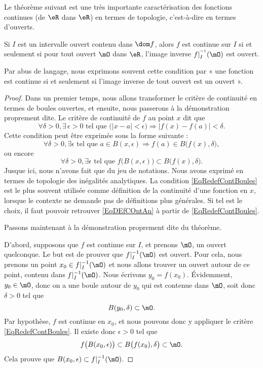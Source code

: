 Le théorème suivant est une très importante caractérisation des fonctions continues (de \( \eR\) dans \( \eR\)) en termes de topologie, c'est-à-dire en termes d'ouverts.

\begin{theorem}     \label{ThoContInvOuvert}
	Si \( I\) est un intervalle ouvert contenu dans \( \dom f\), alors \( f\) est continue sur \( I\) si et seulement si pour tout ouvert \( \mO\) dans \( \eR\), l'image inverse \( f|_I^{^{-1}}(\mO)\) est ouvert.
\end{theorem}

Par abus de langage, nous exprimons souvent cette condition par « une fonction est continue si et seulement si l'image inverse de tout ouvert est un ouvert ».

\begin{proof}

	Dans un premier temps, nous allons transformer le critère de continuité en termes de boules ouvertes, et ensuite, nous passerons à la démonstration proprement dite. Le critère de continuité de \( f\) au point \( x\) dit que
	\begin{equation}        \label{EqDEfCOntAn}
		\forall \delta>0, \exists\,\epsilon>0\text{ tel que }\big( | x-a |< \epsilon \big)\Rightarrow| f(x)-f(a) |<\delta.
	\end{equation}
	Cette condition peut être exprimée sous la forme suivante :
	\[
		\forall \delta>0, \exists\epsilon\text{ tel que } a\in B(x,\epsilon)\Rightarrow f(a)\in B\big( f(x),\delta \big),
	\]
	ou encore
	\begin{equation}        \label{EqRedefContBoules}
		\forall \delta>0,\exists\epsilon\text{ tel que } f\big( B(x,\epsilon) \big)\subset B\big( f(x),\delta \big).
	\end{equation}
	Jusque ici, nous n'avons fait que du jeu de notations. Nous avons exprimé en termes de topologie des inégalités analytiques. La condition \eqref{EqRedefContBoules} est le plus souvent utilisée comme définition de la continuité d'une fonction en \( x\), lorsque le contexte ne demande pas de définitions plus générales. Si tel est le choix, il faut pouvoir retrouver \eqref{EqDEfCOntAn} à partir de \eqref{EqRedefContBoules}.

	Passons maintenant à la démonstration proprement dite du théorème.

	D'abord, supposons que \( f\) est continue sur \( I\), et prenons \( \mO\), un ouvert quelconque. Le but est de prouver que \( f|_I^{-1}(\mO)\) est ouvert. Pour cela, nous prenons un point \( x_0\in f|_I^{-1}(\mO)\) et nous allons trouver un ouvert autour de ce point, contenu dans \( f|_I^{-1}(\mO)\). Nous écrivons \( y_0=f(x_0)\). Évidemment, \( y_0\in\mO\), donc on a une boule autour de \( y_0\) qui est contenue dans \( \mO\), soit donc \( \delta>0\) tel que
	\[
		B(y_0,\delta)\subset\mO.
	\]
	Par hypothèse, \( f\) est continue en \( x_0\), et nous pouvons donc y appliquer le critère \eqref{EqRedefContBoules}. Il existe donc \( \epsilon>0\) tel que
	\[
		f\big( B(x_0,\epsilon) \big)\subset B\big( f(x_0),\delta \big)\subset\mO.
	\]
	Cela prouve que \( B(x_0,\epsilon)\subset f|_I^{-1}(\mO)\).


\end{proof}
